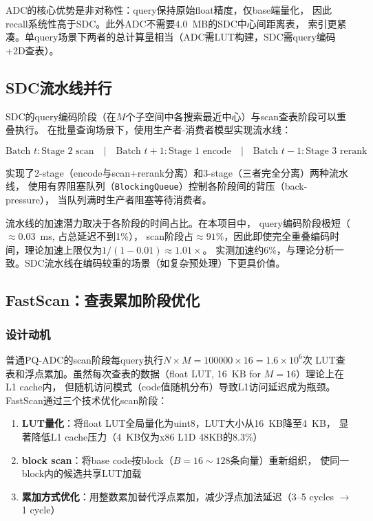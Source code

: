 \documentclass[11pt,a4paper]{article}
\begin{document}
ADC的核心优势是非对称性：query保持原始float精度，仅base端量化，
因此recall系统性高于SDC。此外ADC不需要4.0~MB的SDC中心间距离表，
索引更紧凑。单query场景下两者的总计算量相当（ADC需LUT构建，SDC需query编码+2D查表）。

\subsection{SDC流水线并行}

SDC的query编码阶段（在$M$个子空间中各搜索最近中心）与scan查表阶段可以重叠执行。
在批量查询场景下，使用生产者-消费者模型实现流水线：

\[\text{Batch }t: \text{Stage 2 scan} \quad |\quad \text{Batch }t+1: \text{Stage 1 encode} \quad |\quad \text{Batch }t-1: \text{Stage 3 rerank}\]

实现了2-stage（encode与scan+rerank分离）和3-stage（三者完全分离）两种流水线，
使用有界阻塞队列（\texttt{BlockingQueue}）控制各阶段间的背压（back-pressure），
当队列满时生产者阻塞等待消费者。

流水线的加速潜力取决于各阶段的时间占比。在本项目中，
query编码阶段极短（$\approx 0.03$~ms, 占总延迟不到1\%），
scan阶段占$\approx 91\%$，因此即使完全重叠编码时间，理论加速上限仅为$1/(1-0.01)\approx 1.01\times$。
实测加速约6\%，与理论分析一致。SDC流水线在编码较重的场景（如复杂预处理）下更具价值。

\subsection{FastScan：查表累加阶段优化}

\subsubsection{设计动机}

普通PQ-ADC的scan阶段每query执行$N\times M = 100000\times 16 = 1.6\times 10^6$次
LUT查表和浮点累加。虽然每次查表的数据（float LUT, 16~KB for $M=16$）理论上在L1 cache内，
但随机访问模式（code值随机分布）导致L1访问延迟成为瓶颈。
FastScan通过三个技术优化scan阶段：

\begin{enumerate}[nosep]
    \item \textbf{LUT量化}：将float LUT全局量化为uint8，LUT大小从16~KB降至4~KB，
          显著降低L1 cache压力（4~KB仅为x86 L1D 48KB的8.3\%）
    \item \textbf{block scan}：将base code按block（$B=16\sim128$条向量）重新组织，
          使同一block内的候选共享LUT加载
    \item \textbf{累加方式优化}：用整数累加替代浮点累加，减少浮点加法延迟（3--5 cycles $\to$ 1 cycle）
\end{enumerate}
\end{document}
